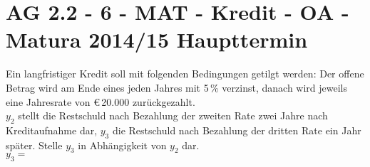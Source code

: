 \section{AG 2.2 - 6 - MAT - Kredit - OA - Matura 2014/15 Haupttermin}

\begin{beispiel}[AG 2.2]{1} %
Ein langfristiger Kredit soll mit folgenden Bedingungen getilgt werden: Der offene Betrag wird am Ende eines jeden Jahres mit 5\,\% verzinst, danach wird jeweils eine Jahresrate von \euro\,20.000 zurückgezahlt. \\

$y_2$ stellt die Restschuld nach Bezahlung der zweiten Rate zwei Jahre nach Kreditaufnahme dar, $y_3$ die Restschuld nach Bezahlung der dritten Rate ein Jahr später. Stelle $y_3$ in Abhängigkeit von $y_2$ dar. \\

$y_3 =$ 
\end{beispiel}